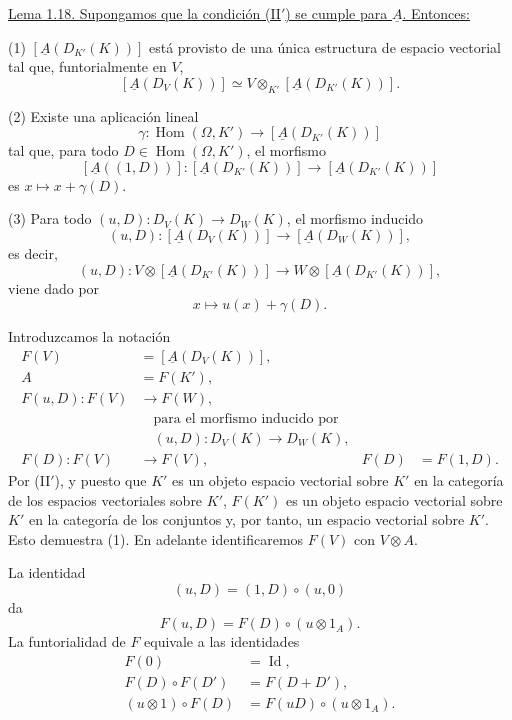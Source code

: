 
\underline{Lema 1.18. Supongamos que la condición (II$'$) se cumple
para $\underline A$. Entonces:}

(1) $[\underline A(D_{K'}(K))]$ está provisto de una única estructura
de espacio vectorial tal que, funtorialmente en $V$,
\[
 [\underline A(D_V(K))]
 \simeq
 V\otimes_{K'}[\underline A(D_{K'}(K))].
\]

(2) Existe una aplicación lineal
\[
 \gamma:\operatorname{Hom}(\Omega,K')
 \longrightarrow [\underline A(D_{K'}(K))]
\]
tal que, para todo $D\in\operatorname{Hom}(\Omega,K')$, el morfismo
\[
 [\underline A((1,D))]:
 [\underline A(D_{K'}(K))]
 \longrightarrow [\underline A(D_{K'}(K))]
\]
es $x\longmapsto x+\gamma(D)$.

(3) Para todo
$(u,D):D_V(K)\longrightarrow D_W(K)$, el morfismo inducido
\[
 (u,D):[\underline A(D_V(K))]
 \longrightarrow[\underline A(D_W(K))],
\]
es decir,
\[
 (u,D):
 V\otimes[\underline A(D_{K'}(K))]
 \longrightarrow
 W\otimes[\underline A(D_{K'}(K))],
\]
viene dado por
\[
 x\longmapsto u(x)+\gamma(D).
\]

Introduzcamos la notación
\[
\begin{aligned}
 F(V)&=[\underline A(D_V(K))],\\
 A&=F(K'),\\
 F(u,D):F(V)&\longrightarrow F(W),\\[-.25ex]
 &\quad\text{para el morfismo inducido por}\\[-.25ex]
 &\quad (u,D):D_V(K)\longrightarrow D_W(K),\\
 F(D):F(V)&\longrightarrow F(V),
   &F(D)&=F(1,D).
\end{aligned}
\]
Por (II$'$), y puesto que $K'$ es un objeto espacio vectorial sobre
$K'$ en la categoría de los espacios vectoriales sobre $K'$,
$F(K')$ es un objeto espacio vectorial sobre $K'$ en la categoría de
los conjuntos y, por tanto, un espacio vectorial sobre $K'$. Esto
demuestra (1). En adelante identificaremos $F(V)$ con $V\otimes A$.

La identidad
\[
 (u,D)=(1,D)\circ(u,0)
\]
da
\[
 F(u,D)=F(D)\circ(u\otimes1_A).
\]
La funtorialidad de $F$ equivale a las identidades
\[
\begin{aligned}
 F(0)&=\operatorname{Id},\\
 F(D)\circ F(D')&=F(D+D'),\\
 (u\otimes1)\circ F(D)
   &=F(uD)\circ(u\otimes1_A).
\end{aligned}
\]

